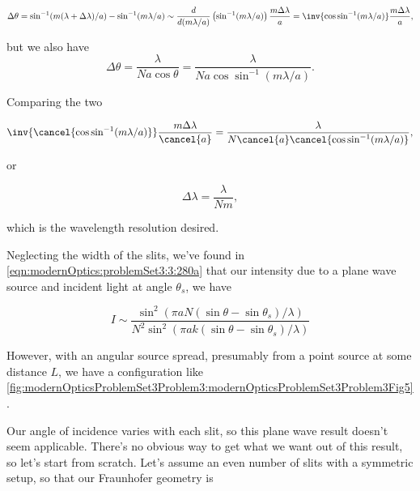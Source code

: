 {\begin{dmath}\label{eqn:modernOptics:problemSet3:3:480}
\Delta \theta
=
\sin^{-1}(m (\lambda + \Delta \lambda)/a)
-
\sin^{-1}(m \lambda/ a)
\sim
\frac{d}{d (m\lambda/a)} \left( \sin^{-1}(m \lambda/ a) \right) \frac{ m \Delta \lambda}{a}
=
\inv{\cos\sin^{-1} (m \lambda/a)}
\frac{ m \Delta \lambda}{a},
\end{dmath}

but we also have
\begin{dmath}\label{eqn:modernOptics:problemSet3:3:500}
\Delta \theta
=
\frac{\lambda}{N a \cos\theta}
=
\frac{\lambda}{N a \cos\sin^{-1}(m \lambda/a)}.
\end{dmath}

Comparing the two

\begin{dmath}\label{eqn:modernOptics:problemSet3:3:520}
\inv{\cancel{\cos\sin^{-1} (m \lambda/a)}}
\frac{ m \Delta \lambda}{\cancel{a}}
=
\frac{\lambda}{N \cancel{a} \cancel{\cos\sin^{-1}(m \lambda/a)}},
\end{dmath}

or

\begin{dmath}\label{eqn:modernOptics:problemSet3:3:540}
\boxed{
\Delta \lambda
=
\frac{\lambda}{N m},
}
\end{dmath}

which is the wavelength resolution desired.


Neglecting the width of the slits, we've found in \ref{eqn:modernOptics:problemSet3:3:280a} that our intensity due to a plane wave source and incident light at angle $\theta_s$, we have

\begin{dmath}\label{eqn:modernOptics:problemSet3:3:560}
I \sim 
\frac
{\sin^2( \pi a N (\sin\theta - \sin\theta_s)/\lambda )}
{N^2 \sin^2( \pi a k (\sin\theta - \sin\theta_s)/\lambda )}
\end{dmath}

However, with an angular source spread, presumably from a point source at some distance $L$, we have a configuration like \cref{fig:modernOpticsProblemSet3Problem3:modernOpticsProblemSet3Problem3Fig5}.


Our angle of incidence varies with each slit, so this plane wave result doesn't seem applicable.  There's no obvious way to get what we want out of this result, so let's start from scratch.  Let's assume an even number of slits with a symmetric setup, so that our Fraunhofer geometry is

}
